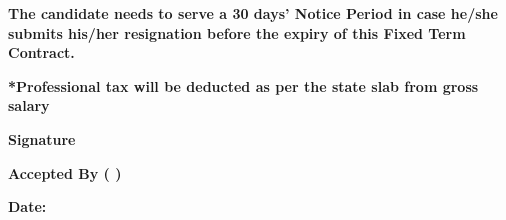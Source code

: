 \documentclass[11pt,a4paper]{article}
\begin{document}
\vspace{0.6cm}

\textbf{The candidate needs to serve a 30 days' Notice Period in case he/she submits his/her resignation before the expiry of this Fixed Term Contract.}

\vspace{0.3cm}

\textbf{*Professional tax will be deducted as per the state slab from gross salary}

\vspace{0.3cm}

\textbf{Signature}

\vspace{0.1cm}

\textbf{}

\vspace{0.15cm}

\textbf{Accepted By (  )}

\vspace{0.15cm}

\textbf{Date: }
\end{document}
